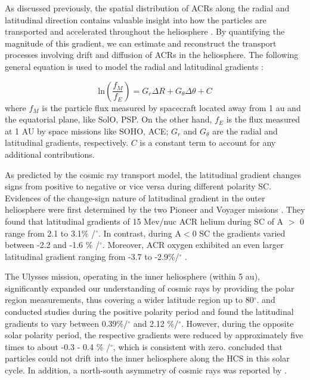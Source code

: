 As discussed previously, the spatial distribution of \acp{ACR} along the radial and latitudinal direction contains valuable insight into how the particles are transported and accelerated throughout the heliosphere \citep{Rankin2021ApJ}. By quantifying the magnitude of this gradient, we can estimate and reconstruct the transport processes involving drift and diffusion of \acp{ACR} in the heliosphere. The following general equation is used to model the radial and latitudinal gradients \citep{Vos2016SoPh}:

\begin{equation}
    \mathrm{ln}(\frac{f_{M}}{f_{E}}) = G_r \Delta R  + G_{\theta} \Delta \theta + C
\end{equation}
where $f_{M}$ is the particle flux measured by spacecraft located away from 1 au and the equatorial plane, like \ac{SolO}, \ac{PSP}. On the other hand, $f_{E}$ is the flux measured at 1 AU by space missions like \ac{SOHO}, \ac{ACE}; $G_r$ and $G_{\theta}$ are the radial and latitudinal gradients, respectively. $C$ is a constant term to account for any additional contributions.


As predicted by the cosmic ray transport model, the latitudinal gradient changes signs from positive to negative or vice versa during different polarity \ac{SC}. Evidences of the change-sign nature of latitudinal gradient in the outer heliosphere were first determined by the two Pioneer and Voyager missions \citep{Mckibben1979ApJ, Cummings1987GeoRL, Christon1986JGR}. They found that latitudinal gradients of 15 Mev/nuc \ac{ACR} helium during \ac{SC} of A $>$ 0 range from 2.1 to 3.1\% /$^\circ$. In contrast, during A$<$0 \ac{SC} the gradients varied between -2.2 and -1.6 \% /$^\circ$. Moreover, \ac{ACR} oxygen exhibited an even larger latitudinal gradient ranging from -3.7 to -2.9\%/$^\circ$ \citep{Cummings1987GeoRL}.

The Ulysses mission, operating in the inner heliosphere (within 5 au), significantly expanded our understanding of cosmic rays by providing the polar region measurements, thus covering a wider latitude region up to 80$^\circ$. \citet{Lanzerotti1995GeoRL} and \citet{Heber1998JGR} conducted studies during the positive polarity period and found the latitudinal gradients to vary between 0.39\%/$^\circ$ and 2.12 \%/$^\circ$. However, during the opposite solar polarity period, the respective gradients were reduced by approximately five times to about -0.3 - 0.4 \% /$^\circ$, which is consistent with zero. \citet{Cummings2009GeoRL} concluded that particles could not drift into the inner heliosphere along the \ac{HCS} in this solar cycle. In addition, a north-south asymmetry of cosmic rays was reported by \citet{Simpson1996ApJ}.

